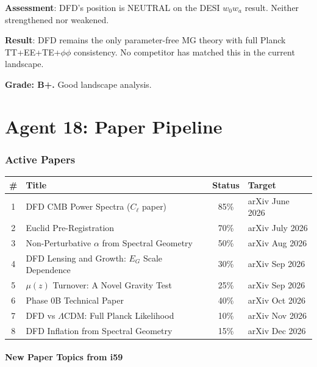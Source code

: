 \documentclass[11pt,a4paper]{article}
\begin{document}
\textbf{Assessment}: DFD's position is NEUTRAL on the DESI $w_0 w_a$ result. Neither strengthened nor weakened.

\begin{tcolorbox}[colback=green!5!white, colframe=green!60!black, title={Agent 17: Competition --- DFD Position STRENGTHENED}]
\textbf{Result}: DFD remains the only parameter-free MG theory with full Planck TT+EE+TE+$\phi\phi$ consistency. No competitor has matched this in the current landscape.

\textbf{Grade: B+.} Good landscape analysis.
\end{tcolorbox}


\part{Agent 18: Paper Pipeline}
\label{part:pipeline}

\section{Active Papers}

\begin{center}
\begin{longtable}{clcl}
\toprule
\textbf{\#} & \textbf{Title} & \textbf{Status} & \textbf{Target} \\
\midrule
1 & DFD CMB Power Spectra ($C_\ell$ paper) & 85\% & arXiv June 2026 \\
2 & Euclid Pre-Registration & 70\% & arXiv July 2026 \\
3 & Non-Perturbative $\alpha$ from Spectral Geometry & 50\% & arXiv Aug 2026 \\
4 & DFD Lensing and Growth: $E_G$ Scale Dependence & 30\% & arXiv Sep 2026 \\
5 & $\mu(z)$ Turnover: A Novel Gravity Test & 25\% & arXiv Sep 2026 \\
6 & Phase 0B Technical Paper & 40\% & arXiv Oct 2026 \\
7 & DFD vs $\Lambda$CDM: Full Planck Likelihood & 10\% & arXiv Nov 2026 \\
8 & DFD Inflation from Spectral Geometry & 15\% & arXiv Dec 2026 \\
\bottomrule
\end{longtable}
\end{center}

\subsection{New Paper Topics from i59}
\end{document}

